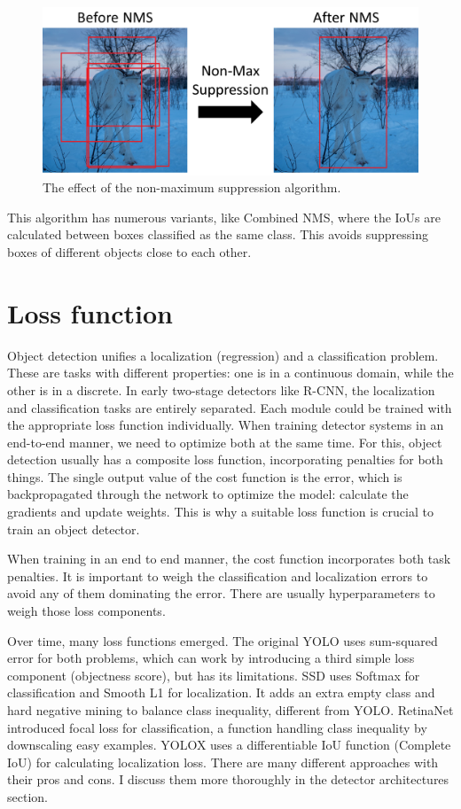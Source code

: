 \begin{figure}[H]
 \centerline{\includegraphics[width=1.0\columnwidth]{.//Figure/Detector/NMS.png}}
 \caption{The effect of the non-maximum suppression algorithm.}
 \label{fig:NMS}
\end{figure}

This algorithm has numerous variants, like Combined NMS, where the IoUs are calculated between boxes classified as the same class. This avoids suppressing boxes of different objects close to each other.

\section{Loss function}

Object detection unifies a localization (regression) and a classification problem. These are tasks with different properties: one is in a continuous domain, while the other is in a discrete. In early two-stage detectors like R-CNN\cite{R-CNN}, the localization and classification tasks are entirely separated. Each module could be trained with the appropriate loss function individually. When training detector systems in an end-to-end manner, we need to optimize both at the same time. For this, object detection usually has a composite loss function, incorporating penalties for both things. The single output value of the cost function is the error, which is backpropagated through the network to optimize the model: calculate the gradients and update weights. This is why a suitable loss function is crucial to train an object detector.

When training in an end to end manner, the cost function incorporates both task penalties. It is important to weigh the classification and localization errors to avoid any of them dominating the error. There are usually hyperparameters to weigh those loss components.

Over time, many loss functions emerged. The original YOLO\cite{YOLO} uses sum-squared error for both problems, which can work by introducing a third simple loss component (objectness score), but has its limitations. SSD\cite{SSD} uses Softmax for classification and Smooth L1 for localization. It adds an extra empty class and hard negative mining to balance class inequality, different from YOLO. RetinaNet\cite{RetinaNet} introduced focal loss for classification, a function handling class inequality by downscaling easy examples. YOLOX\cite{YOLOX} uses a differentiable IoU function\cite{NMS} (Complete IoU) for calculating localization loss. There are many different approaches with their pros and cons. I discuss them more thoroughly in the detector architectures section.

